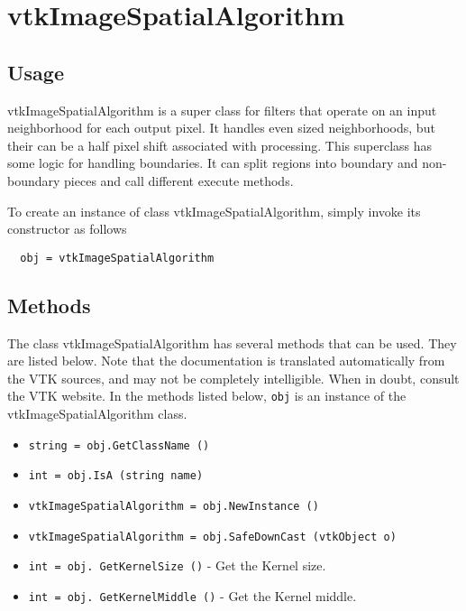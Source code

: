 \section{vtkImageSpatialAlgorithm}

\subsection{Usage}

 vtkImageSpatialAlgorithm is a super class for filters that operate on an
 input neighborhood for each output pixel. It handles even sized
 neighborhoods, but their can be a half pixel shift associated with
 processing.  This superclass has some logic for handling boundaries.  It
 can split regions into boundary and non-boundary pieces and call different
 execute methods.

To create an instance of class vtkImageSpatialAlgorithm, simply
invoke its constructor as follows
\begin{verbatim}
  obj = vtkImageSpatialAlgorithm
\end{verbatim}
\subsection{Methods}

The class vtkImageSpatialAlgorithm has several methods that can be used.
  They are listed below.
Note that the documentation is translated automatically from the VTK sources,
and may not be completely intelligible.  When in doubt, consult the VTK website.
In the methods listed below, \verb|obj| is an instance of the vtkImageSpatialAlgorithm class.
\begin{itemize}
\item  \verb|string = obj.GetClassName ()|

\item  \verb|int = obj.IsA (string name)|

\item  \verb|vtkImageSpatialAlgorithm = obj.NewInstance ()|

\item  \verb|vtkImageSpatialAlgorithm = obj.SafeDownCast (vtkObject o)|

\item  \verb|int = obj. GetKernelSize ()| -  Get the Kernel size.

\item  \verb|int = obj. GetKernelMiddle ()| -  Get the Kernel middle.

\end{itemize}
